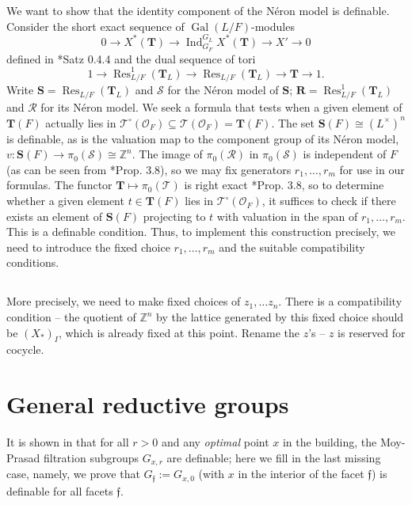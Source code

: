 \documentclass{amsart}
\newcommand{\Z}{{\mathbb Z}}
\newcommand{\ri}{\mathcal{O}}
\newcommand{\bT}{\mathbf {T}}
\newcommand{\bS}{\mathbf{S}}
\newcommand{\bR}{\mathbf{R}}
\newcommand{\ff}{{\mathfrak f}}
\newcommand{\Ner}[1]{\mathcal{#1}}
\newcommand{\NerC}[1]{\mathcal{#1}^\circ}
\DeclareMathOperator{\Gal}{Gal}
\DeclareMathOperator{\Ind}{Ind}
\DeclareMathOperator{\Res}{Res}
\theoremstyle{plain}
\theoremstyle{definition}
\begin{document}
We want to show that the identity component of the N\'eron model is definable.  Consider the short exact sequence of $\Gal(L/F)$-modules
\[
0 \to X^*(\bT) \to \Ind_{G_F}^{G_L} X^*(\bT) \to X' \to 0
\]
defined in \cite{brahm}*{Satz 0.4.4} and the dual sequence of tori
\[
1 \to \Res_{L/F}^1(\bT_L) \to \Res_{L/F} (\bT_L) \to \bT \to 1.
\]
Write $\bS = \Res_{L/F} (\bT_L)$ and $\Ner{S}$ for the N\'eron model of $\bS$; $\bR = \Res_{L/F}^1 (\bT_L)$ and $\Ner{R}$ for its N\'eron model. 
We seek a formula that tests when a given element of $\bT(F)$ actually lies in $\NerC{T}(\ri_F) \subseteq \Ner{T}(\ri_F) = \bT(F)$. The set $\bS(F) \cong (L^\times)^n$ is definable, as is the valuation map to the component group of its N\'eron model, $v : \bS(F) \to \pi_0(\Ner{S}) \cong \Z^n$.  The image of $\pi_0(\Ner{R})$ in $\pi_0(\Ner{S})$ is independent of $F$ (as can be seen from \cite{bertrapelle-gonzales:13b}*{Prop. 3.8}), so we may fix generators $r_1, \ldots, r_m$ for use in our formulas.  The functor $\bT \mapsto \pi_0(\Ner{T})$ is right exact \cite{bertrapelle-gonzales:13b}*{Prop. 3.8}, so to determine whether a given element $t \in \bT(F)$ lies in $\NerC{T}(\ri_F)$, it suffices to check if there exists an element of $\bS(F)$ projecting to $t$ with valuation in the span of $r_1, \ldots, r_m$.  This is a definable condition.
Thus, to implement this construction precisely, we need to introduce the fixed choice 
$r_1, \dots, r_m$ and the suitable compatibility conditions. 


\subsection{}More precisely, we need to make fixed choices of $z_1, \dots z_n$. 
There is a compatibility condition -- the quotient of $\Z^n$ by the lattice generated by this fixed choice should be $(X_\ast)_I$, which is already fixed at this point. 
Rename the $z$'s -- $z$ is reserved for cocycle.  

\section{General reductive groups}
It is shown in \cite{CGH-2} that for all $r>0$ and any \emph{optimal} point $x$ in the building, the Moy-Prasad filtration subgroups $G_{x, r}$ are definable; here we fill in the last missing case, namely, we prove that $G_{\ff}:=G_{x, 0}$ (with $x$ in the interior of the facet $\ff$)   is definable for  all facets $\ff$.  
\end{document}
